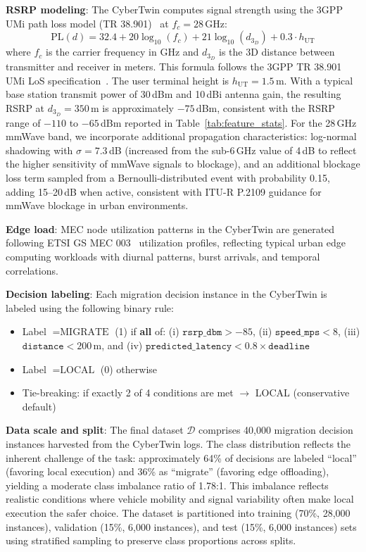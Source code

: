 \documentclass[10pt,letterpaper]{article}
\begin{document}
\textbf{RSRP modeling}: The CyberTwin computes signal strength using the 3GPP UMi path loss model (TR 38.901)~\cite{3gpp2018ts} at $f_c = 28$\,GHz:
\begin{equation}
\text{PL}(d) = 32.4 + 20 \log_{10}(f_c) + 21 \log_{10}(d_{3_D}) + 0.3 \cdot h_{\text{UT}}
\label{eq:pathloss}
\end{equation}
where $f_c$ is the carrier frequency in GHz and $d_{3_D}$ is the 3D distance between transmitter and receiver in meters. This formula follows the 3GPP TR 38.901 UMi LoS specification~\cite{3gpp2018ts}. The user terminal height is $h_{\text{UT}} = 1.5$\,m. With a typical base station transmit power of 30\,dBm and 10\,dBi antenna gain, the resulting RSRP at $d_{3_D}=350$\,m is approximately $-75$\,dBm, consistent with the RSRP range of $-110$ to $-65$\,dBm reported in Table~\ref{tab:feature_stats}. For the 28\,GHz mmWave band, we incorporate additional propagation characteristics: log-normal shadowing with $\sigma = 7.3$\,dB (increased from the sub-6\,GHz value of 4\,dB to reflect the higher sensitivity of mmWave signals to blockage), and an additional blockage loss term sampled from a Bernoulli-distributed event with probability 0.15, adding 15--20\,dB when active, consistent with ITU-R P.2109 guidance for mmWave blockage in urban environments.

\textbf{Edge load}: MEC node utilization patterns in the CyberTwin are generated following ETSI GS MEC 003~\cite{etsi_mec003} utilization profiles, reflecting typical urban edge computing workloads with diurnal patterns, burst arrivals, and temporal correlations.

\textbf{Decision labeling}: Each migration decision instance in the CyberTwin is labeled using the following binary rule:
\begin{itemize}
    \item Label $= \text{MIGRATE}$ (1) if \textbf{all} of: (i) $\texttt{rsrp\_dbm} > -85$, (ii) $\texttt{speed\_mps} < 8$, (iii) $\texttt{distance} < 200$\,m, and (iv) $\texttt{predicted\_latency} < 0.8 \times \texttt{deadline}$
    \item Label $= \text{LOCAL}$ (0) otherwise
    \item Tie-breaking: if exactly 2 of 4 conditions are met $\rightarrow$ LOCAL (conservative default)
\end{itemize}

\textbf{Data scale and split}: The final dataset $\mathcal{D}$ comprises 40,000 migration decision instances harvested from the CyberTwin logs. The class distribution reflects the inherent challenge of the task: approximately 64\% of decisions are labeled ``local'' (favoring local execution) and 36\% as ``migrate'' (favoring edge offloading), yielding a moderate class imbalance ratio of 1.78:1. This imbalance reflects realistic conditions where vehicle mobility and signal variability often make local execution the safer choice. The dataset is partitioned into training (70\%, 28,000 instances), validation (15\%, 6,000 instances), and test (15\%, 6,000 instances) sets using stratified sampling to preserve class proportions across splits.
\end{document}
